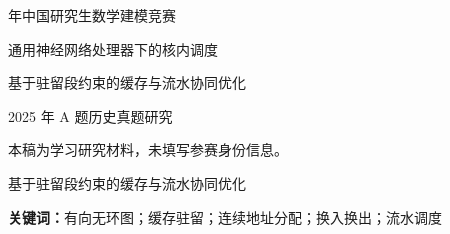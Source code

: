 \documentclass[fontset=windows, 12pt, a4paper]{ctexart}
\begin{document}
\begin{titlepage}
\centering
\vspace*{1.6cm}
{ 年中国研究生数学建模竞赛\par}
\vspace{2cm}
{\heiti 通用神经网络处理器下的核内调度\par}
\vspace{1cm}
{\heiti 基于驻留段约束的缓存与流水协同优化\par}
\vspace{1.6cm}
{2025 年 A 题历史真题研究\par}
\vfill
本稿为学习研究材料，未填写参赛身份信息。\par
\end{titlepage}
\setcounter{page}{1}
\begin{center}
{\heiti 基于驻留段约束的缓存与流水协同优化}\par
{}
\end{center}

\par\noindent\textbf{关键词：}有向无环图；缓存驻留；连续地址分配；换入换出；流水调度
\clearpage










\clearpage
\appendix
{}

\end{document}
